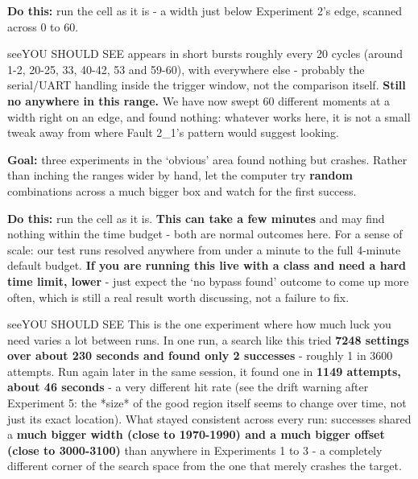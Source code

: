 \documentclass[11pt,letterpaper]{article}
\begin{document}
\textbf{Do this:} run the cell as it is - a width just below Experiment 2's edge, scanned across  0
to 60.

\begin{guidecallout}{see}{YOU SHOULD SEE}
 appears in short bursts roughly every 20 cycles (around 1-2, 20-25, 33, 40-42, 53 and 59-60), with
 everywhere else - probably the serial/UART handling inside the trigger window, not the comparison
itself. \textbf{Still no  anywhere in this range.} We have now swept 60 different moments at a width
right on an edge, and found nothing: whatever works here, it is not a small tweak away from where Fault 2\_1's pattern
would suggest looking.
\end{guidecallout}


\textbf{Goal:} three experiments in the `obvious' area found nothing but crashes. Rather than inching the ranges wider
by hand, let the computer try \textbf{random} combinations across a much bigger box and watch for the first success.

\textbf{Do this:} run the cell as it is. \textbf{This can take a few minutes} and may find nothing within the time
budget - both are normal outcomes here. For a sense of scale: our test runs resolved anywhere from under a minute to
the full 4-minute default budget. \textbf{If you are running this live with a class and need a hard time limit, lower
} - just expect the `no bypass found' outcome to come up more often, which is still a real
result worth discussing, not a failure to fix.

\begin{guidecallout}{see}{YOU SHOULD SEE}
This is the one experiment where how much luck you need varies a lot between runs. In one run, a search like this
tried \textbf{7248 settings over about 230 seconds and found only 2 successes} - roughly 1 in 3600 attempts. Run again
later in the same session, it found one in \textbf{1149 attempts, about 46 seconds} - a very different hit rate (see
the drift warning after Experiment 5: the *size* of the good region itself seems to change over time, not just its
exact location). What stayed consistent across every run: successes shared a \textbf{much bigger width (close to
1970-1990) and a much bigger offset (close to 3000-3100)} than anywhere in Experiments 1 to 3 - a completely different
corner of the search space from the one that merely crashes the target.
\end{guidecallout}
\end{document}
